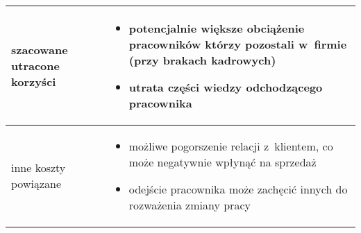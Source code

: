 \begin{table}
\begin{center}
\begin{tabular}{|P{.15\textwidth}|p{.75\textwidth}|}
            szacowane utracone korzyści &
            \begin{itemize}
                \item potencjalnie większe obciążenie pracowników którzy pozostali w~firmie (przy brakach kadrowych)
                \item utrata części wiedzy odchodzącego pracownika
            \end{itemize} \\
            \hline

            inne koszty powiązane &
            \begin{itemize}
                \item możliwe pogorszenie relacji z~klientem, co może negatywnie wpłynąć na sprzedaż
                \item odejście pracownika może zachęcić innych do rozważenia zmiany pracy
            \end{itemize} \\
            \hline
        \end{tabular}
    \end{center}
    \raggedright{}
    \vspace{0.75cm}
\end{table}
\thispagestyle{normal}
